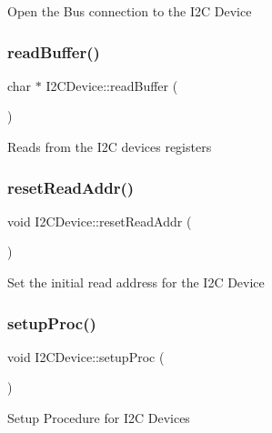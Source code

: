Open the Bus connection to the I2C Device\mbox{\label{classI2CDevice_a46507a420f6865581ad41d6198897ee7}} 
\subsubsection{\texorpdfstring{read\+Buffer()}{readBuffer()}}
{\footnotesize\ttfamily char $\ast$ I2\+C\+Device\+::read\+Buffer (\begin{DoxyParamCaption}{ }\end{DoxyParamCaption})\hspace{0.3cm}{\ttfamily [protected]}}

Reads from the I2C devices registers\mbox{\label{classI2CDevice_a683bdc938beaea0fc8af85f3996c4aa6}} 
\subsubsection{\texorpdfstring{reset\+Read\+Addr()}{resetReadAddr()}}
{\footnotesize\ttfamily void I2\+C\+Device\+::reset\+Read\+Addr (\begin{DoxyParamCaption}{ }\end{DoxyParamCaption})\hspace{0.3cm}{\ttfamily [protected]}}

Set the initial read address for the I2C Device\mbox{\label{classI2CDevice_aa3a0bbea776167210f22dc03580757b1}} 
\subsubsection{\texorpdfstring{setup\+Proc()}{setupProc()}}
{\footnotesize\ttfamily void I2\+C\+Device\+::setup\+Proc (\begin{DoxyParamCaption}{ }\end{DoxyParamCaption})\hspace{0.3cm}{\ttfamily [protected]}}

Setup Procedure for I2C Devices

